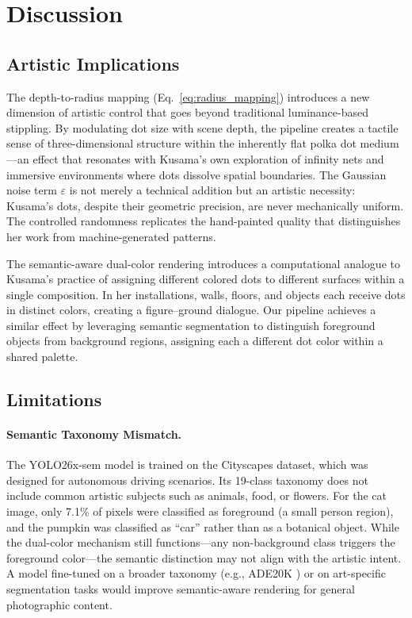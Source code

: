 \section{Discussion}
\label{sec:discussion}

\subsection{Artistic Implications}

The depth-to-radius mapping (Eq.~\ref{eq:radius_mapping}) introduces a
new dimension of artistic control that goes beyond traditional
luminance-based stippling. By modulating dot size with scene depth, the
pipeline creates a tactile sense of three-dimensional structure within
the inherently flat polka dot medium---an effect that resonates with
Kusama's own exploration of infinity nets and immersive environments
where dots dissolve spatial boundaries. The Gaussian noise term
$\varepsilon$ is not merely a technical addition but an artistic
necessity: Kusama's dots, despite their geometric precision, are never
mechanically uniform. The controlled randomness replicates the
hand-painted quality that distinguishes her work from machine-generated
patterns.

The semantic-aware dual-color rendering introduces a computational
analogue to Kusama's practice of assigning different colored dots to
different surfaces within a single composition. In her installations,
walls, floors, and objects each receive dots in distinct colors,
creating a figure--ground dialogue. Our pipeline achieves a similar
effect by leveraging semantic segmentation to distinguish foreground
objects from background regions, assigning each a different dot color
within a shared palette.

\subsection{Limitations}

\paragraph{Semantic Taxonomy Mismatch.}
The YOLO26x-sem model is trained on the Cityscapes dataset, which was
designed for autonomous driving scenarios. Its 19-class taxonomy does
not include common artistic subjects such as animals, food, or
flowers. For the cat image, only 7.1\% of pixels were classified as
foreground (a small person region), and the pumpkin was classified as
``car'' rather than as a botanical object. While the dual-color
mechanism still functions---any non-background class triggers the
foreground color---the semantic distinction may not align with the
artistic intent. A model fine-tuned on a broader taxonomy (e.g.,
ADE20K \citep{zhou2017scene}) or on art-specific segmentation tasks
would improve semantic-aware rendering for general photographic
content.

